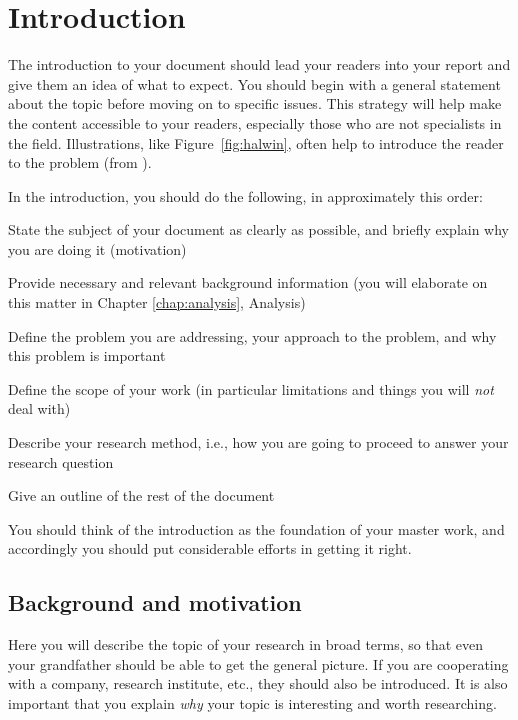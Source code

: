 \chapter{Introduction}
\label{chap:intro}

The introduction to your document should lead your
readers into your report and give them an idea of what to expect.
You should
begin with a general statement about the topic before moving on
to specific issues. This strategy will help make the content
accessible to your readers, especially those who are not specialists
in the field. Illustrations, like Figure~\ref{fig:halwin}, often
help to introduce the reader to the problem (from  \cite{kjeldsen05cor}).

\label{fig:halwin}


In the introduction, you should do the following, in approximately this order:
\begin{compactitem}
  \item State the subject of your document as clearly as possible, and briefly explain why you are doing it (motivation)
    \item Provide necessary and relevant background information (you will elaborate on this matter in Chapter \ref{chap:analysis}, Analysis)
  \item Define the problem you are addressing, your approach to the problem, and why this problem is important
  \item Define the scope of your work (in particular limitations and things you will {\em not} deal with)
  \item Describe your research method, i.e., how you are going to proceed to answer your research question
  \item Give an outline of the rest of the document
\end{compactitem}

You should think of the introduction  as the foundation of your master work, and accordingly you should put considerable efforts in getting it right. 


\section{Background and motivation}
\label{sec:background-motivation}

Here you will describe the topic of your research in broad terms, so that even your grandfather should be able to get the general picture. If you are cooperating with a company, research institute, etc., they should also be introduced. It is also important that you explain {\em why} your topic is interesting and worth researching.


